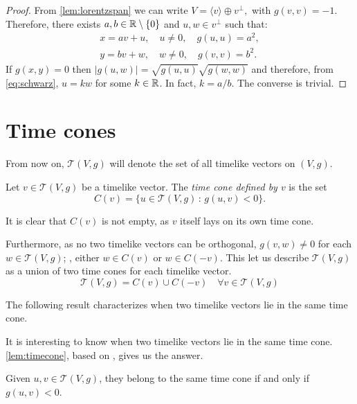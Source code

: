 \begin{proof}
    From \autoref{lem:lorentzspan} we can write $V=\langle v \rangle \oplus v^{\perp},$ with $g(v,v)=-1$. Therefore, there exists $a,b \in \mathbb{R}\setminus\{0\}$ and $u,w \in v^\perp$ such that:
    \begin{align*}
        x=av+u, \quad u\neq 0, \quad g(u,u)=a^2,\\
        y=bv+w, \quad w\neq 0, \quad g(v,v)=b^2.
    \end{align*}
    If $g(x,y)=0$ then $\lvert g(u,w) \rvert = \sqrt{g(u,u)}\sqrt{g(w,w)}$ and therefore, from \autoref{eq:schwarz}, $u=kw$ for some $k\in \mathbb{R}$. In fact, $k=a/b$. The converse is trivial.
\end{proof}

\section{Time cones}

From now on, $\mathcal{T}(V,g)$ will denote the set of all timelike vectors on $(V,g)$.

\begin{definition}
	Let $v\in \mathcal{T}(V,g)$ be a timelike vector. The \emph{time cone defined by $v$} is the set
	\[
	C(v)=\{u\in\mathcal{T}(V,g)\, : \, g(u,v)<0 \}.
	\]
\end{definition}

It is clear that $C(v)$ is not empty, as $v$ itself lays on its own time cone.

Furthermore, as no two timelike vectors can be orthogonal, $g(v,w) \neq 0$ for each $w \in \mathcal{T}(V,g)$; \ie, either $w\in C(v)$ or $w\in C(-v)$. This let us describe $\mathcal{T}(V,g)$ as a union of two time cones for each timelike vector.
\[
\mathcal{T}(V,g) = C(v) \cup C(-v) \quad \forall v\in \mathcal{T}(V,g)
\]

The following result characterizes when two timelike vectors lie in the same time cone.

It is interesting to know when two timelike vectors lie in the same time cone. \autoref{lem:timecone}, based on \cite[Lemma 5.29]{oneill83}, gives us the answer.

\begin{lemma}\label{lem:timecone}
Given $u,v\in \mathcal{T}(V,g)$, they belong to the same time cone if and only if $g(u,v)<0$.
\end{lemma}

